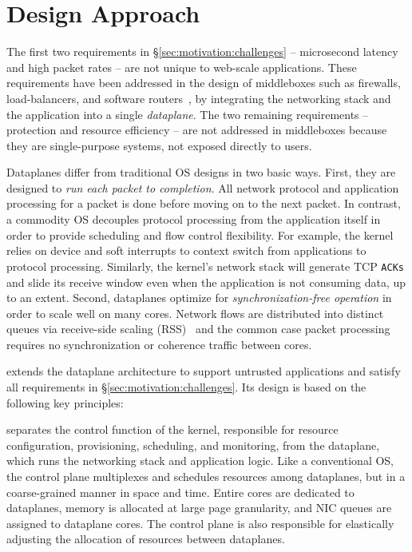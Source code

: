 \section{\ix Design Approach}
\label{sec:design}

The first two requirements in \S\ref{sec:motivation:challenges} --
microsecond latency and high packet rates -- are not unique to
web-scale applications. These requirements have been addressed in the
design of middleboxes such as firewalls, load-balancers, and software
routers~\cite{routebricks,click}, by integrating the networking stack
and the application into a single \emph{dataplane}. The two remaining
requirements -- protection and resource efficiency -- are not
addressed in middleboxes because they are single-purpose systems, not
exposed directly to users.

Dataplanes differ from traditional OS designs in two basic
ways. First, they are designed to \emph{run each packet to
  completion}. All network protocol and application processing for a
packet is done before moving on to the next packet.  In contrast, a
commodity OS decouples protocol processing from the application itself
in order to provide scheduling and flow control flexibility.  For
example, the kernel relies on device and soft interrupts to context
switch from applications to protocol processing. Similarly, the
kernel's network stack will generate TCP \texttt{ACKs} and slide its
receive window even when the application is not consuming data, up to
an extent. Second, dataplanes optimize for \emph{synchronization-free
  operation} in order to scale well on many cores. Network flows are
distributed into distinct queues via receive-side scaling
(RSS)~\cite{url:rss} and the common case packet processing requires no
synchronization or coherence traffic between cores.

\ix extends the dataplane architecture to support untrusted
applications and satisfy all requirements in
\S\ref{sec:motivation:challenges}. Its design is based on the
following key principles:


 \ix
separates the control function of the kernel, responsible for resource
configuration, provisioning, scheduling, and monitoring, from the
dataplane, which runs the networking stack and application logic.
Like a conventional OS, the control plane multiplexes and schedules
resources among dataplanes, but in a coarse-grained manner in space
and time. Entire cores are dedicated to dataplanes, memory is
allocated at large page granularity, and NIC queues are assigned to
dataplane cores. The control plane is also responsible for elastically
adjusting the allocation of resources between dataplanes.

